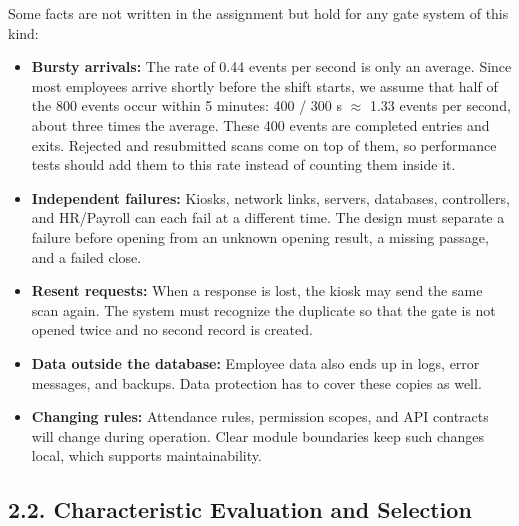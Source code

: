 {}


Some facts are not written in the assignment but hold for any gate system of this kind:

\begin{itemize}[leftmargin=36pt, itemsep=2pt, topsep=4pt, parsep=2pt]

  \item \textbf{Bursty arrivals:} The rate of 0.44 events per second is only an average. Since most employees arrive shortly before the shift starts, we assume that half of the 800 events occur within 5 minutes: 400 / 300 s $\approx$ 1.33 events per second, about three times the average. These 400 events are completed entries and exits. Rejected and resubmitted scans come on top of them, so performance tests should add them to this rate instead of counting them inside it.

  \item \textbf{Independent failures:} Kiosks, network links, servers, databases, controllers, and HR/Payroll can each fail at a different time. The design must separate a failure before opening from an unknown opening result, a missing passage, and a failed close.

  \item \textbf{Resent requests:} When a response is lost, the kiosk may send the same scan again. The system must recognize the duplicate so that the gate is not opened twice and no second record is created.

  \item \textbf{Data outside the database:} Employee data also ends up in logs, error messages, and backups. Data protection has to cover these copies as well.

  \item \textbf{Changing rules:} Attendance rules, permission scopes, and API contracts will change during operation. Clear module boundaries keep such changes local, which supports maintainability.

\end{itemize}

\subsection*{2.2. Characteristic Evaluation and Selection}

{}


